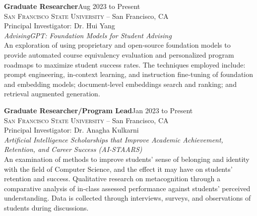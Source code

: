 \documentclass[hidelinks, 10.5pt]{article}
\def\contentwidth{0.9\linewidth}    %
\def\contentspacing{2.5mm}          %
\begin{document}
{{    \begin{minipage}[ct]{\contentwidth}
        \textbf{Graduate Researcher}\hfill Aug 2023 to Present\\
        \textsc{San Francisco State University} -- San Francisco, CA\\
        Principal Investigator: Dr. Hui Yang\vspace{1mm}\\
        {\textit{AdvisingGPT: Foundation Models for Student Advising}}\\
        An exploration of using proprietary and open-source foundation models to provide automated course equivalency evaluation and
        personalized program roadmaps to maximize student success rates. The techniques employed include: prompt engineering, in-context
        learning, and instruction fine-tuning of foundation and embedding models; document-level embeddings search and ranking; and
        retrieval augmented generation.
    \end{minipage}

    \vspace{\contentspacing}

    \begin{minipage}[ct]{\contentwidth}
        \textbf{Graduate Researcher/Program Lead}\hfill Jan 2023 to Present\\
        \textsc{San Francisco State University} -- San Francisco, CA\\
        Principal Investigator: Dr. Anagha Kulkarni\vspace{1mm}\\
        {\textit{Artificial Intelligence Scholarships that Improve Academic Achievement, Retention, and Career Success (AI-STAARS)}}\\
        An examination of methods to improve students' sense of belonging and identity with the field of Computer Science,
        and the effect it may have on students' retention and success.  Qualitative research on metacognition through a comparative
        analysis of in-class assessed performance against students' perceived understanding.  Data is collected through interviews, surveys,
        and observations of students during discussions.
    \end{minipage}

}}
\end{document}
